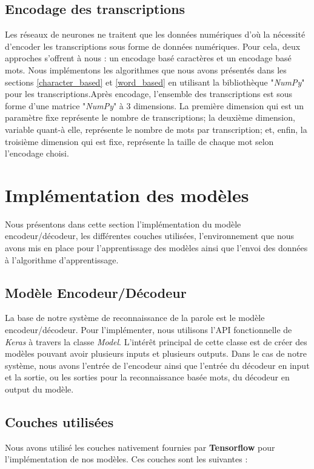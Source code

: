 \subsection{Encodage des transcriptions}
Les réseaux de neurones ne traitent que les données numériques d'où la nécessité d'encoder les transcriptions sous forme de données numériques. Pour cela, deux approches s'offrent à nous : un encodage basé caractères et un encodage basé mots. Nous implémentons les algorithmes que nous avons présentés dans les sections \ref{character_based} et \ref{word_based} en utilisant la bibliothèque "\textit{NumPy}" pour les transcriptions.Après encodage, l'ensemble des transcriptions est sous forme d'une matrice "\textit{NumPy}" à 3 dimensions. La première dimension qui est un paramètre fixe représente le nombre de transcriptions; la deuxième dimension, variable quant-à elle, représente le nombre de mots par transcription; et, enfin, la troisième dimension qui est fixe, représente la taille de chaque mot selon l'encodage choisi.
 
\section{Implémentation des modèles}
Nous présentons dans cette section l'implémentation du modèle encodeur/décodeur, les différentes couches utilisées, l'environnement que nous avons mis en place pour l'apprentissage des modèles ainsi que l'envoi des données à l'algorithme d'apprentissage.

\subsection{Modèle Encodeur/Décodeur}
La base de notre système de reconnaissance de la parole est le modèle encodeur/décodeur. Pour l'implémenter, nous utilisons l'API fonctionnelle de \textit{Keras} \cite{functional_api} à travers la classe \textit{Model}. L'intérêt principal de cette classe est de créer des modèles pouvant avoir plusieurs inputs et plusieurs outputs. Dans le cas de notre système, nous avons l'entrée de l'encodeur ainsi que l'entrée du décodeur en input et la sortie, ou les sorties pour la reconnaissance basée mots, du décodeur en output du modèle.

\subsection{Couches utilisées}
Nous avons utilisé les couches nativement fournies par \textbf{Tensorflow} pour l'implémentation de nos modèles. Ces couches sont les suivantes : 

